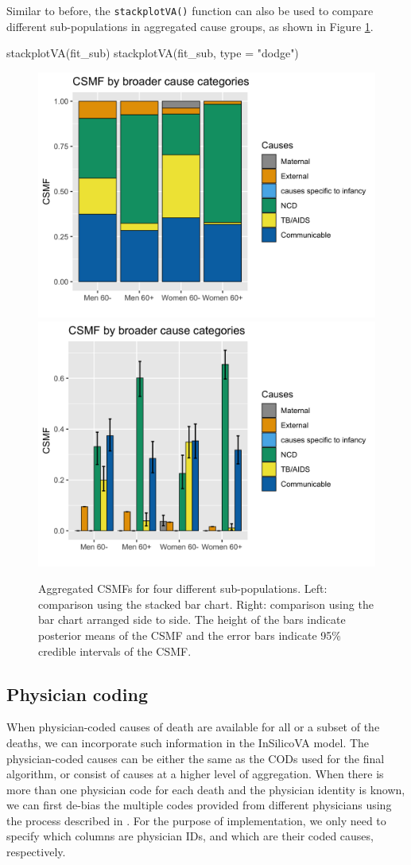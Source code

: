 Similar to before, the \texttt{stackplotVA()} function can also be used
to compare different sub-populations in aggregated cause groups, as
shown in Figure \ref{fig:ins6}.

\begin{Schunk}
\begin{Sinput}
stackplotVA(fit_sub)
stackplotVA(fit_sub, type = "dodge")
\end{Sinput}
\begin{figure}[!h]

{\centering \includegraphics[width=0.49\linewidth,]{openVA-RJ-R1_files/figure-latex/ins6-1} \includegraphics[width=0.49\linewidth,]{openVA-RJ-R1_files/figure-latex/ins6-2} 

}

\caption[Aggregated CSMFs for four different sub-populations]{Aggregated CSMFs for four different sub-populations. Left: comparison using the stacked bar chart. Right: comparison using the bar chart arranged side to side. The height of the bars indicate posterior means of the CSMF and the error bars indicate 95\% credible intervals of the CSMF.}\label{fig:ins6}
\end{figure}
\end{Schunk}

\hypertarget{physician-coding}{%
\subsection{Physician coding}\label{physician-coding}}

When physician-coded causes of death are available for all or a subset
of the deaths, we can incorporate such information in the InSilicoVA
model. The physician-coded causes can be either the same as the CODs
used for the final algorithm, or consist of causes at a higher level of
aggregation. When there is more than one physician code for each death
and the physician identity is known, we can first de-bias the multiple
codes provided from different physicians using the process described in
\citet{insilico}. For the purpose of implementation, we only need to
specify which columns are physician IDs, and which are their coded
causes, respectively.

